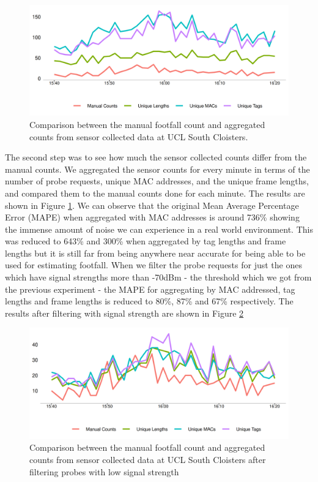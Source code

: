 \begin{figure}
  \includegraphics{images/ucl-comparison-before.png}
  \caption{Comparison between the manual footfall count and aggregated counts from sensor collected data at UCL South Cloisters.}
  \label{figure:collection:ucl:before}
\end{figure}

The second step was to see how much the sensor collected counts differ from the manual counts.
We aggregated the sensor counts for every minute in terms of the number of probe requests, unique MAC addresses, and the unique frame lengths, and compared them to the manual counts done for each minute.
The results are shown in Figure \ref{figure:collection:ucl:before}.
We can observe that the original Mean Average Percentage Error (MAPE) when aggregated with MAC addresses is around 736\% showing the immense amount of noise we can experience in a real world environment.
This was reduced to 643\% and 300\% when aggregated by tag lengths and frame lengths but it is still far from being anywhere near accurate for being able to be used for estimating footfall.
When we filter the probe requests for just the ones which have signal strengths more than -70dBm - the threshold which we got from the previous experiment - the MAPE for aggregating by MAC addressed, tag lengths and frame lengths is reduced to 80\%, 87\% and 67\% respectively.
The results after filtering with signal strength are shown in Figure \ref{figure:collection:ucl:after}

\begin{figure}
  \includegraphics{images/ucl-comparison-after.png}
  \caption{Comparison between the manual footfall count and aggregated counts from sensor collected data at UCL South Cloisters after filtering probes with low signal strength}
  \label{figure:collection:ucl:after}
\end{figure}

